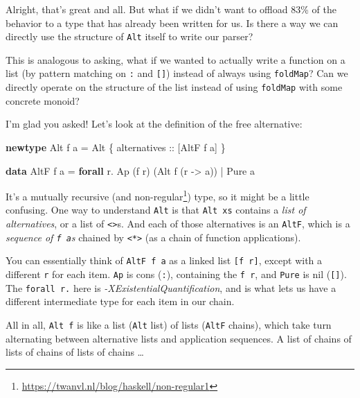 \documentclass[]{article}
\newenvironment{Shaded}{}{}
\newcommand{\DataTypeTok}[1]{\textcolor[rgb]{0.56,0.13,0.00}{#1}}
\newcommand{\KeywordTok}[1]{\textcolor[rgb]{0.00,0.44,0.13}{\textbf{#1}}}
\newcommand{\NormalTok}[1]{#1}
\newcommand{\OperatorTok}[1]{\textcolor[rgb]{0.40,0.40,0.40}{#1}}
\newcommand{\OtherTok}[1]{\textcolor[rgb]{0.00,0.44,0.13}{#1}}
\renewcommand{\href}[2]{#2\footnote{\url{#1}}}
\begin{document}
Alright, that's great and all. But what if we didn't want to offload 83\% of the
behavior to a type that has already been written for us. Is there a way we can
directly use the structure of \texttt{Alt} itself to write our parser?

This is analogous to asking, what if we wanted to actually write a function on a
list (by pattern matching on \texttt{:} and \texttt{{[}{]}}) instead of always
using \texttt{foldMap}? Can we directly operate on the structure of the list
instead of using \texttt{foldMap} with some concrete monoid?

I'm glad you asked! Let's look at the definition of the free alternative:

\begin{Shaded}
\begin{Highlighting}[]
\KeywordTok{newtype} \DataTypeTok{Alt}\NormalTok{ f a }\OtherTok{=} \DataTypeTok{Alt}\NormalTok{ \{}\OtherTok{ alternatives ::}\NormalTok{ [}\DataTypeTok{AltF}\NormalTok{ f a] \}}

\KeywordTok{data} \DataTypeTok{AltF}\NormalTok{ f a }\OtherTok{=} \KeywordTok{forall}\NormalTok{ r}\OperatorTok{.} \DataTypeTok{Ap}\NormalTok{ (f r) (}\DataTypeTok{Alt}\NormalTok{ f (r }\OtherTok{{-}\textgreater{}}\NormalTok{ a))}
              \OperatorTok{|}           \DataTypeTok{Pure}\NormalTok{ a}
\end{Highlighting}
\end{Shaded}

It's a mutually recursive (and
\href{https://twanvl.nl/blog/haskell/non-regular1}{non-regular}) type, so it
might be a little confusing. One way to understand \texttt{Alt} is that
\texttt{Alt\ xs} contains a \emph{list of alternatives}, or a list of
\texttt{\textless{}\textbar{}\textgreater{}}s. And each of those alternatives is
an \texttt{AltF}, which is a \emph{sequence of \texttt{f\ a}s} chained by
\texttt{\textless{}*\textgreater{}} (as a chain of function applications).

You can essentially think of \texttt{AltF\ f\ a} as a linked list
\texttt{{[}f\ r{]}}, except with a different \texttt{r} for each item.
\texttt{Ap} is cons (\texttt{:}), containing the \texttt{f\ r}, and
\texttt{Pure} is nil (\texttt{{[}{]}}). The \texttt{forall\ r.} here is
\emph{-XExistentialQuantification}, and is what lets us have a different
intermediate type for each item in our chain.

All in all, \texttt{Alt\ f} is like a list (\texttt{Alt} list) of lists
(\texttt{AltF} chains), which take turn alternating between alternative lists
and application sequences. A list of chains of lists of chains of lists of
chains \ldots{}
\end{document}
